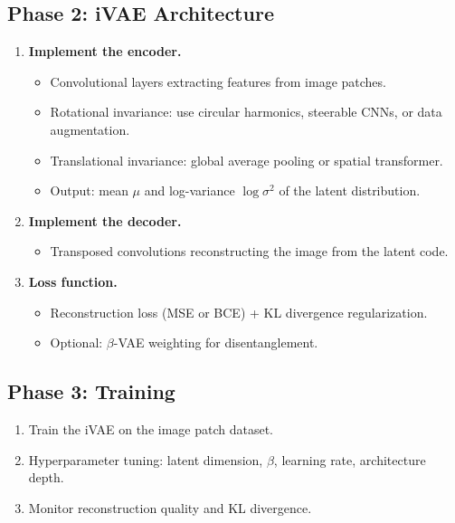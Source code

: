 \documentclass[11pt,a4paper]{article}
\begin{document}
\subsection{Phase 2: iVAE Architecture}
\begin{enumerate}[label=\textbf{2.\arabic*}]
  \item \textbf{Implement the encoder.}
    \begin{itemize}
      \item Convolutional layers extracting features from image patches.
      \item Rotational invariance: use circular harmonics, steerable CNNs, or data augmentation.
      \item Translational invariance: global average pooling or spatial transformer.
      \item Output: mean $\mu$ and log-variance $\log \sigma^2$ of the latent distribution.
    \end{itemize}
  \item \textbf{Implement the decoder.}
    \begin{itemize}
      \item Transposed convolutions reconstructing the image from the latent code.
    \end{itemize}
  \item \textbf{Loss function.}
    \begin{itemize}
      \item Reconstruction loss (MSE or BCE) + KL divergence regularization.
      \item Optional: $\beta$-VAE weighting for disentanglement.
    \end{itemize}
\end{enumerate}

\subsection{Phase 3: Training}
\begin{enumerate}[label=\textbf{3.\arabic*}]
  \item Train the iVAE on the image patch dataset.
  \item Hyperparameter tuning: latent dimension, $\beta$, learning rate, architecture depth.
  \item Monitor reconstruction quality and KL divergence.
\end{enumerate}
\end{document}
